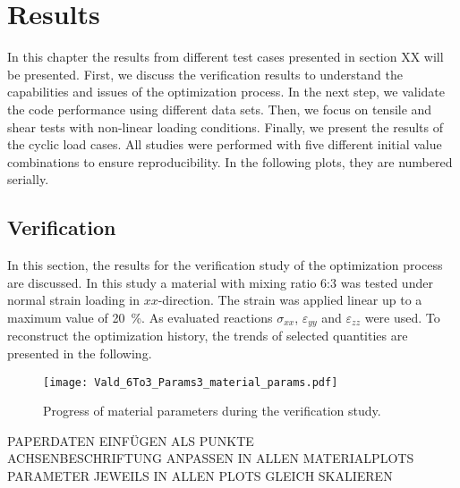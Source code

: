     \chapter{Results}\label{chap: results}

In this chapter the results from different test cases presented in section XX will be presented. First, we discuss the verification results to understand the capabilities and issues of the optimization process. In the next step, we validate the code performance using different data sets. Then, we focus on tensile and shear tests with non-linear loading conditions. 
Finally, we present the results of the cyclic load cases. All studies were performed with five different initial value combinations to ensure reproducibility. In the following plots, they are numbered serially. 


\section{Verification}\label{sec: verification}

In this section, the results for the verification study of the optimization process are discussed. In this study a material with mixing ratio 6:3 was tested under normal strain loading in $xx$-direction. The strain was applied linear up to a maximum value of 20 \%. As evaluated reactions $\sigma_{xx}$, $\varepsilon_{yy}$ and $\varepsilon_{zz}$ were used. To reconstruct the optimization history, the trends of selected quantities are presented in the following.

\begin{figure}[H]
    \centering
    \texttt{[image: Vald\_6To3\_Params3\_material\_params.pdf]}
    \caption{Progress of material parameters during the verification study.}
    \label{fig:verifMaterialParams}
\end{figure}
PAPERDATEN EINFÜGEN ALS PUNKTE \\
ACHSENBESCHRIFTUNG ANPASSEN IN ALLEN MATERIALPLOTS \\
PARAMETER JEWEILS IN ALLEN PLOTS GLEICH SKALIEREN \\


